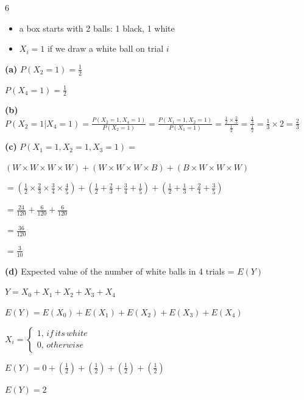 \documentclass[12 pt]{article}
\begin{document}
    \begin{exercise}{6}
    \hfill

    \begin{itemize}
        \item a box starts with 2 balls: 1 black, 1 white
        \item $X_i = 1$ if we draw a white ball on trial $i$
    \end{itemize}

    \hfill

    \textbf{(a)} $P(X_2 = 1) = \frac{1}{2}$

    $P(X_4 = 1) = \frac{1}{2}$

    \hfill

    \textbf{(b)} $P(X_2 = 1|X_4 = 1) = \frac{P(X_2 = 1, X_4 = 1)}{P(X_2 = 1)} = \frac{P(X_1 = 1, X_2 = 1)}{P(X_1 = 1)} = \frac{\frac{1}{2} \times \frac{2}{3}}{\frac{1}{2}} = \frac{\frac{1}{3}}{\frac{1}{2}} = \frac{1}{3} \times 2 = \frac{2}{3}$

    \hfill

    \textbf{(c)} $P(X_1 = 1, X_2 = 1, X_3 = 1) = $

    $(W \times W \times W \times W) + (W \times W \times W \times B) + (B \times W \times W \times W)$

    $= (\frac{1}{2} \times \frac{2}{3} \times \frac{3}{4} \times \frac{4}{5})  + (\frac{1}{2} + \frac{2}{3} + \frac{3}{4} + \frac{1}{5}) + (\frac{1}{2} + \frac{1}{3} + \frac{2}{4} + \frac{3}{5})$

    $= \frac{24}{120} + \frac{6}{120} + \frac{6}{120}$

    $= \frac{36}{120}$

    $= \frac{3}{10}$

    \hfill

    \textbf{(d)} Expected value of the number of white balls in 4 trials = $E(Y)$

    $Y = X_0 + X_1 + X_2 + X_3 + X_4$

    $E(Y) = E(X_0) + E(X_1) + E(X_2) + E(X_3) + E(X_4)$

    $X_i = \begin{cases}
        1, \, if \, its \, white \\
        0, \, otherwise
    \end{cases}$

    $E(Y) = 0 + (\frac{1}{2}) + (\frac{1}{2}) + (\frac{1}{2}) + (\frac{1}{2})$

    $E(Y) = 2$

    \hfill


\end{exercise}
\end{document}
